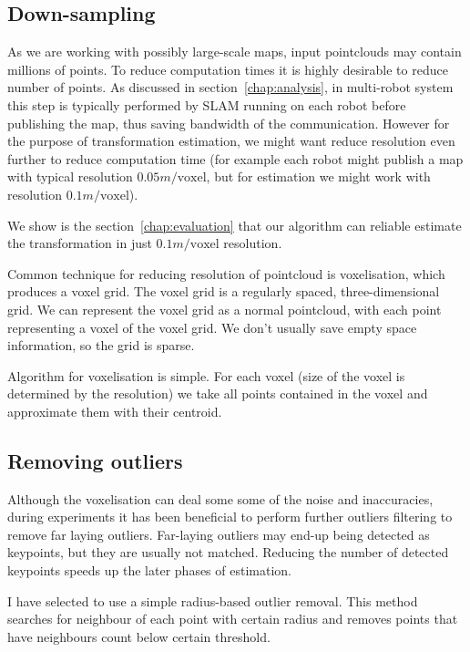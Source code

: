 \subsection{Down-sampling}

As we are working with possibly large-scale maps, input pointclouds may contain millions of points. To reduce computation times it is highly desirable to reduce number of points. As discussed in section~\ref{chap:analysis}, in multi-robot system this step is typically performed by \gls{SLAM} running on each robot before publishing the map, thus saving bandwidth of the communication. However for the purpose of transformation estimation, we might want reduce resolution even further to reduce computation time (for example each robot might publish a map with typical resolution $0.05 m/\text{voxel}$, but for estimation we might work with resolution $0.1 m/\text{voxel}$).

We show is the section~\ref{chap:evaluation} that our algorithm can reliable estimate the transformation in just $0.1 m/\text{voxel}$ resolution.

Common technique for reducing resolution of pointcloud is voxelisation, which produces a voxel grid. The voxel grid is a regularly spaced, three-dimensional grid. We can represent the voxel grid as a normal pointcloud, with each point representing a voxel of the voxel grid. We don't usually save empty space information, so the grid is sparse.

Algorithm for voxelisation is simple. For each voxel (size of the voxel is determined by the resolution) we take all points contained in the voxel and approximate them with their centroid.

\subsection{Removing outliers}

Although the voxelisation can deal some some of the noise and inaccuracies, during experiments it has been beneficial to perform further outliers filtering to remove far laying outliers. Far-laying outliers may end-up being detected as keypoints, but they are usually not matched. Reducing the number of detected keypoints speeds up the later phases of estimation.

I have selected to use a simple radius-based outlier removal. This method searches for neighbour of each point with certain radius and removes points that have neighbours count below certain threshold.

